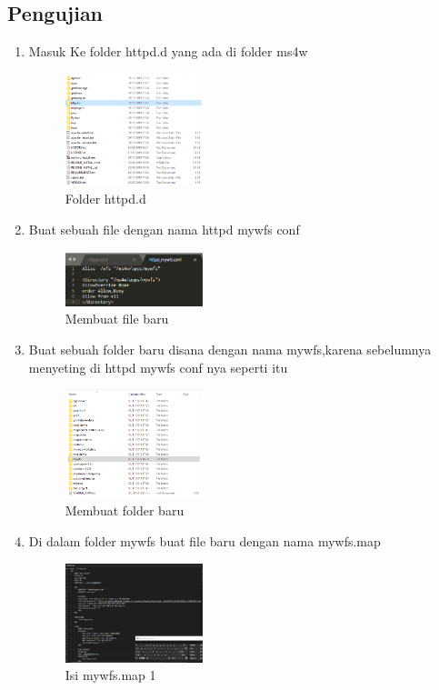 \subsection{Pengujian}
\begin{enumerate}
  \item Masuk Ke folder httpd.d yang ada di folder ms4w
  \hfill\break
    \begin{figure}[H]
		\includegraphics[width=4cm]{figures/1174008/4/10.png}
		\centering
		\caption{Folder httpd.d}
    \end{figure}

  \item Buat sebuah file dengan nama httpd mywfs conf
  \hfill\break
    \begin{figure}[H]
		\includegraphics[width=4cm]{figures/1174008/4/11.png}
		\centering
		\caption{Membuat file baru}
    \end{figure}

  \item Buat sebuah folder baru disana dengan nama mywfs,karena sebelumnya menyeting di httpd mywfs conf nya seperti itu
  \hfill\break
    \begin{figure}[H]
		\includegraphics[width=4cm]{figures/1174008/4/12.png}
		\centering
		\caption{Membuat folder baru}
    \end{figure}

  \item Di dalam folder mywfs buat file baru dengan nama mywfs.map
  \hfill\break
    \begin{figure}[H]
		\includegraphics[width=4cm]{figures/1174008/4/13.png}
		\centering
		\caption{Isi mywfs.map 1}
    \end{figure}


\end{enumerate}
